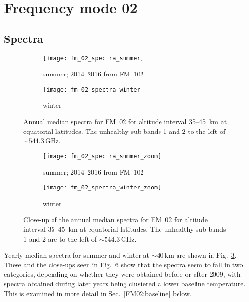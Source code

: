\section{Frequency mode 02}
\label{FM02}

\subsection{Spectra}
\label{FM02:spectra}

\begin{figure}[ht]
    \centering
    \begin{subfigure}[b]{0.9545\textwidth}
        \texttt{[image: fm\_02\_spectra\_summer]}
        \caption{summer; 2014--2016 from FM~102}\label{fig:spectra:02:summer}
    \end{subfigure}
    \begin{subfigure}[b]{0.9545\textwidth}
        \texttt{[image: fm\_02\_spectra\_winter]}
        \caption{winter}\label{fig:spectra:02:winter}
    \end{subfigure}
    \caption{Annual median spectra for FM~02 for altitude interval 35--45~km at
        equatorial latitudes. The unhealthy sub-bands 1 and 2 to the left of
        $\sim544.3\,\mathrm{GHz}$.
        }\label{fig:spectra:02}
\end{figure}

\begin{figure}[ht]
    \centering
    \begin{subfigure}[b]{0.9545\textwidth}
        \texttt{[image: fm\_02\_spectra\_summer\_zoom]}
        \caption{summer; 2014--2016 from
            FM~102}\label{fig:spectra:02:summer:closeup}
    \end{subfigure}
    \begin{subfigure}[b]{0.9545\textwidth}
        \texttt{[image: fm\_02\_spectra\_winter\_zoom]}
        \caption{winter}\label{fig:spectra:02:winter:closeup}
    \end{subfigure}
    \caption{Close-up of the annual median spectra for FM~02 for altitude
        interval 35--45~km at equatorial latitudes.  The unhealthy sub-bands
        1 and 2 are to the left of $\sim544.3\,\mathrm{GHz}$.
        }\label{fig:spectra:02:closeup}
\end{figure}

\noindent
Yearly median spectra for summer and winter at $\sim40\,\mathrm{km}$ are shown
in Fig.~\ref{fig:spectra:02}.  These and the close-ups seen in
Fig.~\ref{fig:spectra:02:closeup} show that the spectra seem to fall in two
categories, depending on whether they were obtained before or after 2009, with
spectra obtained during later years being clustered a lower baseline
temperature.  This is examined in more detail in Sec.~\ref{FM02:baseline}
below.


